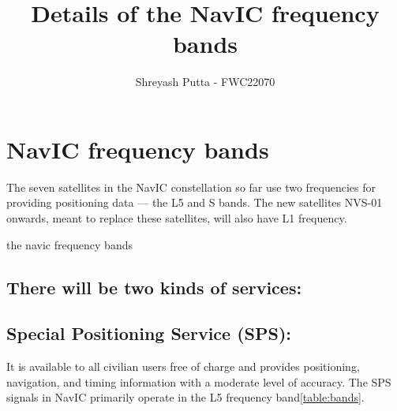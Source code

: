 \documentclass{article}
\begin{document}
\title{Details of the NavIC frequency bands }
\author{\Large Shreyash Putta - FWC22070}
\date{}

\maketitle

\section{NavIC frequency bands}
		The seven satellites in the NavIC constellation so far use two frequencies for providing positioning data — the L5 and S bands. The new satellites NVS-01 onwards, meant to replace these satellites, will also have L1 frequency.
	
		
	\begin{table}[h!]
	\small
	\centering
	\caption{the navic frequency bands}
	\label{table:bands}
	
	\end{table}

\subsection*{There will be two kinds of services:}
		

\subsection{Special Positioning Service (SPS):}
	It is available to all civilian users free of charge and provides positioning, navigation, and timing information with a moderate level of accuracy. The SPS signals in NavIC primarily operate in the L5 frequency band\ref{table:bands}.
\end{document}

